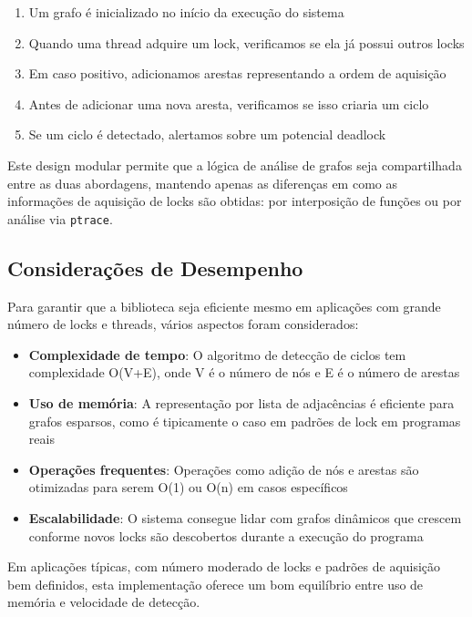 \begin{enumerate}
    \item Um grafo é inicializado no início da execução do sistema
    \item Quando uma thread adquire um lock, verificamos se ela já possui outros locks
    \item Em caso positivo, adicionamos arestas representando a ordem de aquisição
    \item Antes de adicionar uma nova aresta, verificamos se isso criaria um ciclo
    \item Se um ciclo é detectado, alertamos sobre um potencial deadlock
\end{enumerate}

Este design modular permite que a lógica de análise de grafos seja compartilhada entre as duas abordagens, mantendo apenas as diferenças em como as informações de aquisição de locks são obtidas: por interposição de funções ou por análise via \texttt{ptrace}.

\subsection{Considerações de Desempenho}

Para garantir que a biblioteca seja eficiente mesmo em aplicações com grande número de locks e threads, vários aspectos foram considerados:

\begin{itemize}
    \item \textbf{Complexidade de tempo}: O algoritmo de detecção de ciclos tem complexidade O(V+E), onde V é o número de nós e E é o número de arestas
    \item \textbf{Uso de memória}: A representação por lista de adjacências é eficiente para grafos esparsos, como é tipicamente o caso em padrões de lock em programas reais
    \item \textbf{Operações frequentes}: Operações como adição de nós e arestas são otimizadas para serem O(1) ou O(n) em casos específicos
    \item \textbf{Escalabilidade}: O sistema consegue lidar com grafos dinâmicos que crescem conforme novos locks são descobertos durante a execução do programa
\end{itemize}

Em aplicações típicas, com número moderado de locks e padrões de aquisição bem definidos, esta implementação oferece um bom equilíbrio entre uso de memória e velocidade de detecção.
